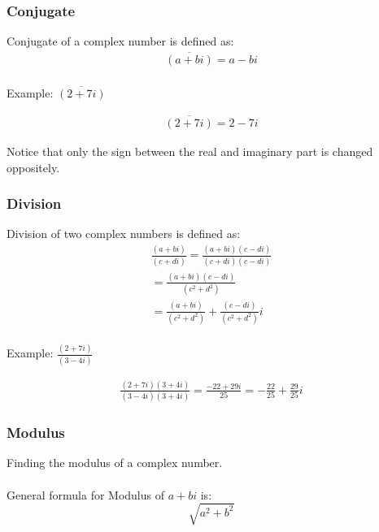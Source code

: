 \subsubsection{Conjugate}
Conjugate of a complex number is defined as:
\let\conjugatet\overline
\begin{equation}
    \begin{split}
        \conjugatet{(a+bi)}=a-bi\\
    \end{split}
\end{equation}

Example: $\conjugatet{(2+7i)}$

\begin{equation}
    \begin{split}
        \conjugatet{(2+7i)}=2-7i
    \end{split}
\end{equation}

\begin{center}
    Notice that only the sign between the real and imaginary part is changed oppositely.
\end{center}

\subsubsection{Division}
Division of two complex numbers is defined as:
\begin{equation}
    \begin{split}
    \frac{(a+bi)}{(c+di)} = \frac{(a+bi)(c-di)} {(c+di)(c-di)}\\
    = \frac{(a+bi)(c-di)} {(c^2+d^2)}\\
    = \frac{(a+bi)}{(c^2+d^2)} + \frac{(c-di)}{(c^2+d^2)}i\\    
    \end{split}
\end{equation}

Example: $\frac{(2+7i)}{(3-4i)}$

\begin{equation}
    \begin{split}
    \frac{(2+7i)(3+4i)}{(3-4i)(3+4i)} = \frac{-22+29i}{25}
    = -\frac{22}{25} + \frac{29}{25}i
    \end{split}
\end{equation}



\subsubsection{Modulus}
Finding the modulus of a complex number. \\\\
General formula for Modulus of $a+bi$ is:
\begin{equation}
    \sqrt{a^2+b^2}
\end{equation}

